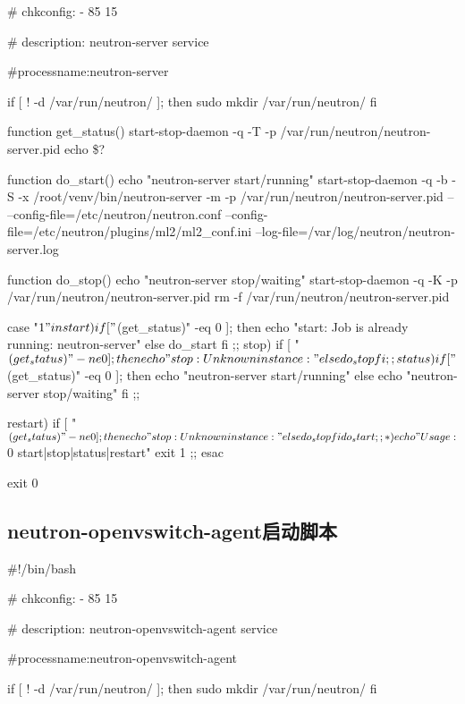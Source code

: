 \documentclass[a4paper,left=1.5cm,right=1.5cm,11pt]{article}
\begin{document}
# chkconfig:  - 85 15  

# description: neutron-server  service

#processname:neutron-server

if [ ! -d /var/run/neutron/ ]; then
   sudo mkdir /var/run/neutron/
fi

function get_status(){
    start-stop-daemon -q -T -p /var/run/neutron/neutron-server.pid
    echo \$?
}

function do_start(){
    echo "neutron-server start/running"
    start-stop-daemon -q -b -S -x /root/venv/bin/neutron-server -m -p /var/run/neutron/neutron-server.pid -- --config-file=/etc/neutron/neutron.conf --config-file=/etc/neutron/plugins/ml2/ml2_conf.ini --log-file=/var/log/neutron/neutron-server.log
}

function do_stop(){
    echo "neutron-server stop/waiting"
    start-stop-daemon -q -K -p /var/run/neutron/neutron-server.pid
    rm -f /var/run/neutron/neutron-server.pid
}

case "$1" in

  start)
        if [ "$(get_status)" -eq 0 ]; then
            echo "start: Job is already running: neutron-server"
        else
            do_start
        fi
        ;;
  stop)
        if [ "$(get_status)" -ne 0 ]; then
            echo "stop: Unknown instance:"
        else
            do_stop
        fi
        ;;

  status)
        if [ "$(get_status)" -eq 0 ]; then
            echo "neutron-server start/running"
        else
            echo "neutron-server stop/waiting"
        fi
        ;;

  restart)
        if [ "$(get_status)" -ne 0 ]; then
            echo "stop: Unknown instance:"
        else
            do_stop
        fi
        do_start
        ;;

  *)
        echo "Usage: $0 {start|stop|status|restart}"
        exit 1
        ;;
esac

exit 0

\subsection{neutron-openvswitch-agent启动脚本}
#!/bin/bash

# chkconfig:  - 85 15  

# description: neutron-openvswitch-agent  service

#processname:neutron-openvswitch-agent


if [ ! -d /var/run/neutron/ ]; then
   sudo mkdir /var/run/neutron/
fi
\end{document}
